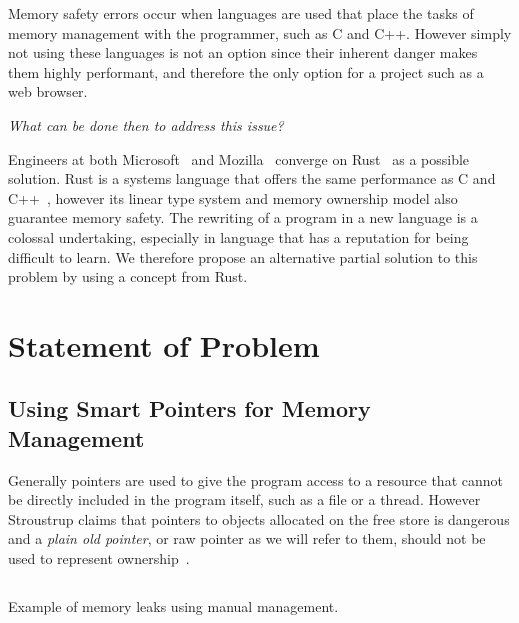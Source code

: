 \documentclass{proposal}
\begin{document}
    Memory safety errors occur when languages are used that place the tasks of memory management with the programmer, such as C and C++.
    However simply not using these languages is not an option since their inherent danger makes them highly performant, and therefore the only option for a project such as a web browser.

    \emph{What can be done then to address this issue?}

    Engineers at both Microsoft~\cite{Thomas2019} and Mozilla~\cite{Hostfelt2019} converge on Rust~\cite{Balasubramanian2017} as a possible solution.
    Rust is a systems language that offers the same performance as C and C++~\cite{Lin2016}, however its linear type system and memory ownership model also guarantee memory safety.
    The rewriting of a program in a new language is a colossal undertaking, especially in language that has a reputation for being difficult to learn.
    We therefore propose an alternative partial solution to this problem by using a concept from Rust.




    \section{Statement of Problem}\label{sec:statement-of-problem}

    \subsection{Using Smart Pointers for Memory Management}\label{subsec:using-smart-pointers-for-memory-management}

    Generally pointers are used to give the program access to a resource that cannot be directly included in the program itself, such as a file or a thread.
    However Stroustrup claims that pointers to objects allocated on the free store is dangerous and a \emph{plain old pointer}, or raw pointer as we will refer to them, should not be used to represent ownership~\cite{Stroustrup2018}.

    \begin{listing}
        \inputminted{c++}{code/manual-leak.cpp}
        \caption{Example of memory leaks using manual management.}
        \label{lst:manual-leak}
    \end{listing}

\end{document}
